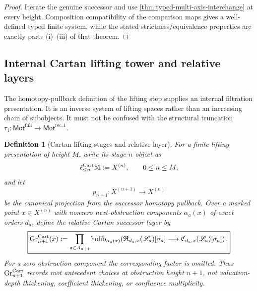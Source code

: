 \documentclass[11pt]{article}
\newtheorem{definition}[theorem]{Definition}
\theoremstyle{remark}
\providecommand{\RecOneMot}{\mathsf{Mot}^{\mathrm{rec},1}}
\providecommand{\FullMot}{\mathsf{Mot}^{\mathrm{full}}}
\providecommand{\tauone}{\tau_{1}}
\begin{document}
\begin{proof}
Iterate the genuine successor and use
\cref{thm:typed-multi-axis-interchange} at every height.  Composition compatibility of
the comparison maps gives a well-defined typed finite system, while the stated
strictness/equivalence properties are exactly parts (i)--(iii) of that theorem.
\end{proof}

\subsection{Internal Cartan lifting tower and relative layers}

The homotopy-pullback definition of the lifting step supplies an internal filtration
presentation.  It is an inverse system of lifting spaces rather than an increasing
chain of subobjects.  It must not be confused with the structural truncation
\(\tauone:\FullMot\to\RecOneMot\).

\begin{definition}[Cartan lifting stages and relative layer]
\label{def:cartan-truncation-successor-layer}
For a finite lifting presentation of height $M$, write its stage-$n$ object as
\[
 \ell^{\rm Cart}_{\le n}\mathbb M:=X^{(n)},\qquad 0\le n\le M,
\]
and let
\[
 p_{n+1}:X^{(n+1)}\longrightarrow X^{(n)}
\]
be the canonical projection from the successor homotopy pullback.  Over a marked point
$x\in X^{(n)}$ with nonzero next-obstruction components
$\alpha_a(x)$ of exact orders $d_a$, define the relative Cartan successor layer by
\begin{equation}\label{eq:cartan-relative-successor-layer}
 \boxed{
 \operatorname{Gr}^{\rm Cart}_{n+1}(x)
 :=
 \prod_{a\in A_{n+1}}
 \operatorname{hofib}_{\alpha_a(x)}\!\left(
   \mathfrak R_{d_a,x}(\mathscr L_a)[\sigma_a]
   \longrightarrow
   \mathfrak C_{d_a,x}(\mathscr L_a)[\sigma_a]
 \right).}
\end{equation}
For a zero obstruction component the corresponding factor is omitted.  Thus
$\operatorname{Gr}^{\rm Cart}_{n+1}$ records root antecedent choices at obstruction
height $n+1$, not valuation-depth thickening, coefficient thickening, or confluence
multiplicity.
\end{definition}
\end{document}
